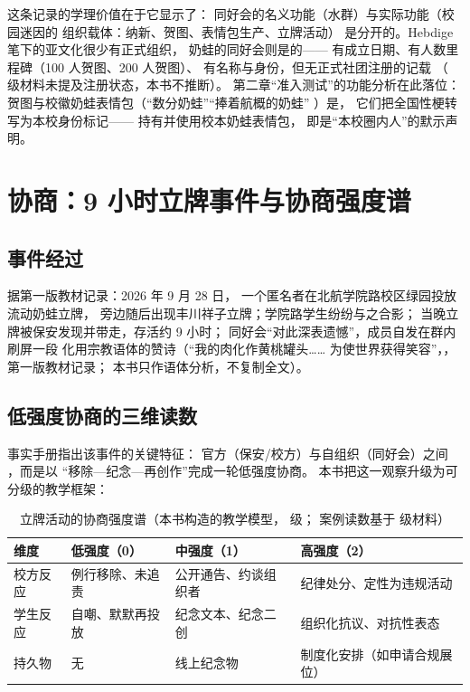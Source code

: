 这条记录的学理价值在于它显示了：
同好会的名义功能（水群）与实际功能（校园迷因的
组织载体：纳新、贺图、表情包生产、立牌活动）
是分开的。Hebdige 笔下的亚文化很少有正式组织，
奶蛙的同好会则是的——
有成立日期、有人数里程碑（100 人贺图、200 人贺图）、
有名称与身份，但无正式社团注册的记载
（ 级材料未提及注册状态，本书不推断）。
第二章“准入测试”的功能分析在此落位：
贺图与校徽奶蛙表情包（“数分奶蛙”“捧着航概的奶蛙”
）是，
它们把全国性梗转写为本校身份标记——
持有并使用校本奶蛙表情包，
即是“本校圈内人”的默示声明。

\section{协商：9 小时立牌事件与协商强度谱}\label{sec:10:negotiation}

\subsection{事件经过}

据第一版教材记录：2026 年 9 月 28 日，
一个匿名者在北航学院路校区绿园投放流动奶蛙立牌，
旁边随后出现丰川祥子立牌；学院路学生纷纷与之合影；
当晚立牌被保安发现并带走，存活约 9 小时；
同好会“对此深表遗憾”，成员自发在群内刷屏一段
化用宗教语体的赞诗（“我的肉化作黄桃罐头……
为使世界获得笑容”，，第一版教材记录；
本书只作语体分析，不复制全文）。

\subsection{低强度协商的三维读数}

事实手册指出该事件的关键特征：
官方（保安/校方）与自组织（同好会）之间
，而是以
“移除—纪念—再创作”完成一轮低强度协商。
本书把这一观察升级为可分级的教学框架：

\begin{table}[htbp]\centering
  \caption{立牌活动的协商强度谱（本书构造的教学模型， 级；
          案例读数基于  级材料）}
  \label{tab:10:spectrum}
  \small
  \begin{tabularx}{\textwidth}{@{}lXXX@{}}
    \toprule
    维度 & 低强度（0） & 中强度（1） & 高强度（2） \\ \midrule
    校方反应 & 例行移除、未追责 &
      公开通告、约谈组织者 &
      纪律处分、定性为违规活动 \\
    学生反应 & 自嘲、默默再投放 &
      纪念文本、纪念二创 &
      组织化抗议、对抗性表态 \\
    持久物 & 无 & 线上纪念物 &
      制度化安排（如申请合规展位） \\ \bottomrule
  \end{tabularx}
\end{table}

